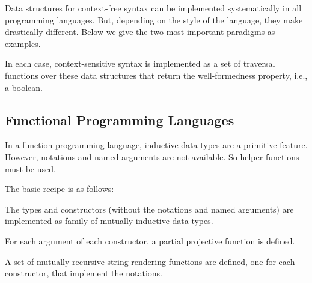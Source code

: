 Data structures for context-free syntax can be implemented systematically in all programming languages.
But, depending on the style of the language, they make drastically different.
Below we give the two most important paradigms as examples.

In each case, context-sensitive syntax is implemented as a set of traversal functions over these data structures that return the well-formedness property, i.e., a boolean.

\subsection{Functional Programming Languages}

In a function programming language, inductive data types are a primitive feature.
However, notations and named arguments are not available.
So helper functions must be used.

The basic recipe is as follows:
\begin{compactitem}
\item The types and constructors (without the notations and named arguments) are implemented as family of mutually inductive data types.
\item For each argument of each constructor, a partial projective function is defined.
\item A set of mutually recursive string rendering functions are defined, one for each constructor, that implement the notations.
\end{compactitem}

